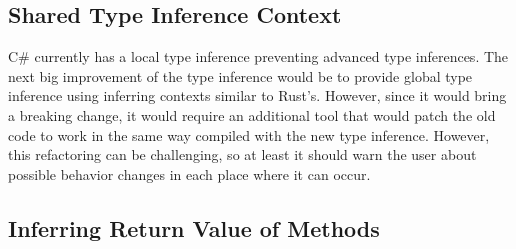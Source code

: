 \subsection{Shared Type Inference Context}

C\# currently has a local type inference preventing advanced type inferences. 
The next big improvement of the type inference would be to provide global type inference using inferring contexts similar to Rust's. 
However, since it would bring a breaking change, it would require an additional tool that would patch the old code to work in the same way compiled with the new type inference. 
However, this refactoring can be challenging, so at least it should warn the user about possible behavior changes in each place where it can occur.

\subsection{Inferring Return Value of Methods}

